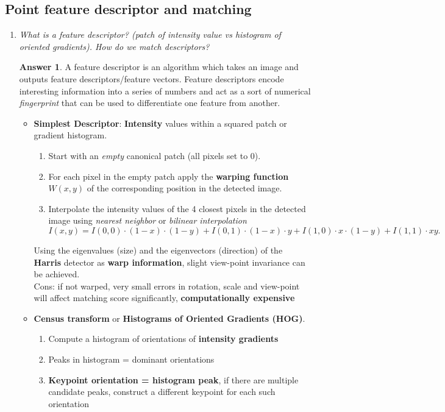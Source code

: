 \documentclass[a4paper,12 pt]{article}
\theoremstyle{definition}
\theoremstyle{remark}
\theoremstyle{definition}
\theoremstyle{definition}
\theoremstyle{definition}
\theoremstyle{definition}
\theoremstyle{remark}
\theoremstyle{remark}
\theoremstyle{definition}
\theoremstyle{definition}
\newtheorem*{answer}{Answer}
\begin{document}
\subsection*{Point feature descriptor and matching}
\begin{enumerate}
\item \textit{What is a feature descriptor? (patch of intensity value vs histogram of oriented gradients). How do we match descriptors?}
\begin{answer}
A feature descriptor is an algorithm which takes an image and outputs feature descriptors/feature vectors. Feature descriptors encode interesting information into a series of numbers and act as a sort of numerical \textit{fingerprint} that can be used to differentiate one feature from another.
\begin{itemize}
\item \textbf{Simplest Descriptor}: \textbf{Intensity} values within a squared patch or gradient histogram.
\begin{enumerate}
\item Start with an \textit{empty} canonical patch (all pixels set to 0).
\item For each pixel in the empty patch apply the \textbf{warping function $W(x,y)$} of the corresponding position in the detected image.
\item Interpolate the intensity values of the 4 closest pixels in the detected image using \textit{nearest neighbor} or \textit{bilinear interpolation}
\begin{equation*}
I(x,y)=I(0,0)\cdot (1-x)\cdot (1-y)+I(0,1)\cdot (1-x)\cdot y+I(1,0)\cdot x \cdot (1-y)+I(1,1)\cdot xy.
\end{equation*}
\end{enumerate}
Using the eigenvalues (size) and the eigenvectors (direction) of the \textbf{Harris} detector as \textbf{warp information}, slight view-point invariance can be achieved. \\
Cons: if not warped, very small errors in rotation, scale and view-point will affect matching score significantly, \textbf{computationally expensive}
\item \textbf{Census transform} or \textbf{Histograms of Oriented Gradients (HOG)}.
\begin{enumerate}
\item Compute a histogram of orientations of \textbf{intensity gradients}
\item Peaks in histogram = dominant orientations
\item \textbf{Keypoint orientation = histogram peak}, if there are multiple candidate peaks, construct a different keypoint for each such orientation

\end{enumerate}
\end{itemize}
\end{answer}
\end{enumerate}
\end{document}
